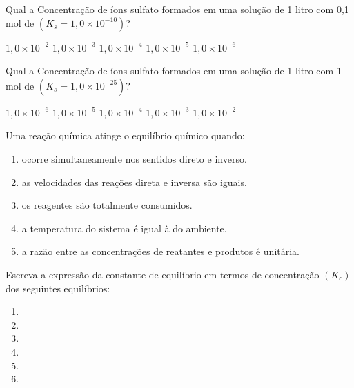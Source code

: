 \documentclass[a4paper,12]{exam}
\begin{document}
\begin{multicols}{2}
	\begin{questions}
		
	
			\question Qual a Concentração de íons sulfato formados em uma solução 			de 1 litro com 0,1 mol de  $(K_s = 1,0 \times 10^{-10})$?
			\begin{oneparchoices}
					\choice $1,0 \times 10^{-2}$
					\choice $1,0 \times 10^{-3}$
					\choice $1,0 \times 10^{-4}$
					\choice $1,0 \times 10^{-5}$
					\choice $1,0 \times 10^{-6}$
			\end{oneparchoices}

			\question Qual a Concentração de íons sulfato formados em uma solução 			de 1 litro com 1 mol de  $(K_s = 1,0 \times 10^{-25})$?\\
				\begin{oneparchoices}
						\choice $1,0 \times 10^{-6}$
						\choice $1,0 \times 10^{-5}$
						\choice $1,0 \times 10^{-4}$
						\choice $1,0 \times 10^{-3}$
						\choice $1,0 \times 10^{-2}$
				\end{oneparchoices}

			\question Uma reação química atinge o equilíbrio químico quando:
				\begin{enumerate}[label=\alph*)]
				  \item ocorre simultaneamente nos sentidos direto e inverso.
				  \item as velocidades das reações direta e inversa são iguais.
				  \item os reagentes são totalmente consumidos.
				  \item a temperatura do sistema é igual à do ambiente.
				  \item a razão entre as concentrações de reatantes e produtos é unitária.
				\end{enumerate}

				\question Escreva a expressão da constante de equilíbrio em termos de concentração $(K_c)$ dos seguintes equilíbrios:
				\begin{enumerate}[label=\alph*)]
				  \item {}
				  \item {}
				  \item {}
				  \item {}
				  \item {}
				  \item {}
				\end{enumerate}
		

\end{questions}
\end{multicols}
\end{document}
